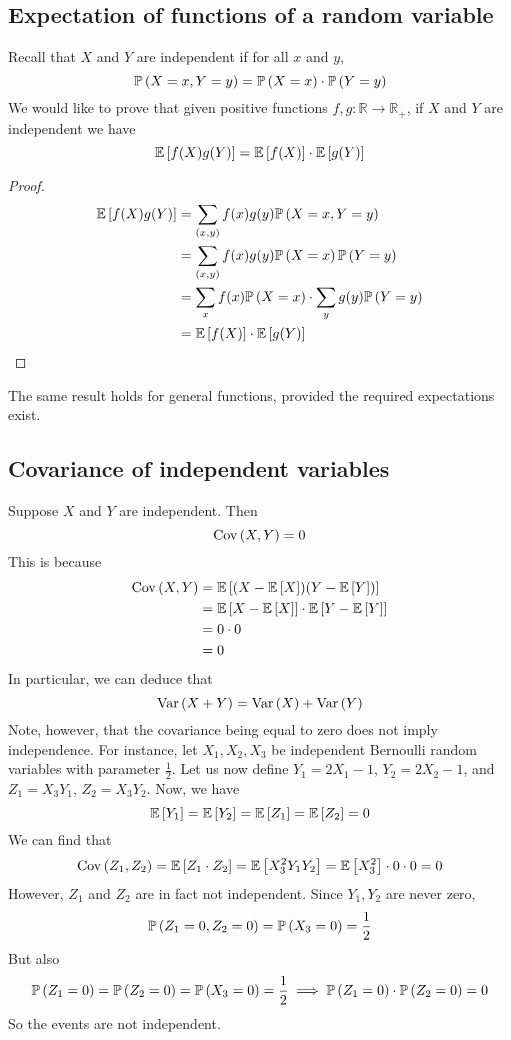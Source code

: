 \subsection{Expectation of functions of a random variable}
Recall that \(X\) and \(Y\) are independent if for all \(x\) and \(y\),
\[
	\mathbb{P}\left({X = x, Y = y}\right) = \mathbb{P}\left({X = x}\right) \cdot \mathbb{P}\left({Y = y}\right)
\]
We would like to prove that given positive functions \(f, g \colon \mathbb R \to \mathbb R_+\), if \(X\) and \(Y\) are independent we have
\[
	\mathbb{E}\left[{f(X)g(Y)}\right] = \mathbb{E}\left[{f(X)}\right] \cdot \mathbb{E}\left[{g(Y)}\right]
\]
\begin{proof}
	\begin{align*}
		\mathbb{E}\left[{f(X)g(Y)}\right] & = \sum_{(x, y)} f(x) g(y) \mathbb{P}\left({X = x, Y = y}\right)                 \\
		                  & = \sum_{(x, y)} f(x) g(y) \mathbb{P}\left({X = x}\right) \mathbb{P}\left({Y = y}\right)           \\
		                  & = \sum_{x} f(x) \mathbb{P}\left({X = x}\right) \cdot \sum_{y} g(y) \mathbb{P}\left({Y = y}\right) \\
		                  & = \mathbb{E}\left[{f(X)}\right] \cdot \mathbb{E}\left[{g(Y)}\right]
	\end{align*}
\end{proof}
The same result holds for general functions, provided the required expectations exist.

\subsection{Covariance of independent variables}
Suppose \(X\) and \(Y\) are independent.
Then
\[
	\operatorname{Cov}\left({X,Y}\right) = 0
\]
This is because
\begin{align*}
	\operatorname{Cov}\left({X,Y}\right) & = \mathbb{E}\left[{(X - \mathbb{E}\left[{X}\right])(Y - \mathbb{E}\left[{Y}\right])}\right]             \\
	          & = \mathbb{E}\left[{X - \mathbb{E}\left[{X}\right]}\right] \cdot \mathbb{E}\left[{Y - \mathbb{E}\left[{Y}\right]}\right] \\
	          & = 0 \cdot 0                                             \\
	          & = 0
\end{align*}
In particular, we can deduce that
\[
	\operatorname{Var}\left({X + Y}\right) = \operatorname{Var}\left({X}\right) + \operatorname{Var}\left({Y}\right)
\]
Note, however, that the covariance being equal to zero does not imply independence.
For instance, let \(X_1, X_2, X_3\) be independent Bernoulli random variables with parameter \(\frac{1}{2}\).
Let us now define \(Y_1 = 2X_1 - 1\), \(Y_2 = 2X_2 - 1\), and \(Z_1 = X_3 Y_1\), \(Z_2 = X_3 Y_2\).
Now, we have
\[
	\mathbb{E}\left[{Y_1}\right] = \mathbb{E}\left[{Y_2}\right] = \mathbb{E}\left[{Z_1}\right] = \mathbb{E}\left[{Z_2}\right] = 0
\]
We can find that
\[
	\operatorname{Cov}\left({Z_1, Z_2}\right) = \mathbb{E}\left[{Z_1 \cdot Z_2}\right] = \mathbb{E}\left[{X_3^2 Y_1 Y_2}\right] = \mathbb{E}\left[{X_3^2}\right] \cdot 0 \cdot 0 = 0
\]
However, \(Z_1\) and \(Z_2\) are in fact not independent.
Since \(Y_1, Y_2\) are never zero,
\[
	\mathbb{P}\left({Z_1 = 0, Z_2 = 0}\right) = \mathbb{P}\left({X_3 = 0}\right) = \frac{1}{2}
\]
But also
\[
	\mathbb{P}\left({Z_1 = 0}\right) = \mathbb{P}\left({Z_2 = 0}\right) = \mathbb{P}\left({X_3 = 0}\right) = \frac{1}{2} \implies \mathbb{P}\left({Z_1 = 0}\right) \cdot \mathbb{P}\left({Z_2 = 0}\right) = 0
\]
So the events are not independent.
